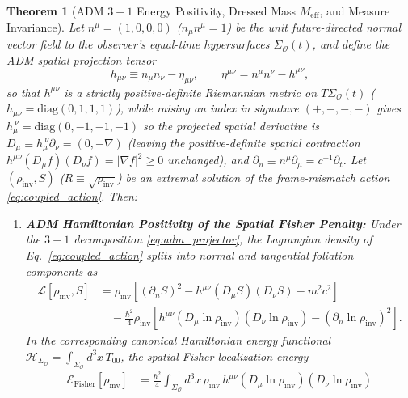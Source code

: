 \documentclass[11pt, a4paper]{article}
\newtheorem{theorem}{Theorem}[section]
\theoremstyle{definition}
\begin{document}
\begin{theorem}[ADM $3+1$ Energy Positivity, Dressed Mass $M_{\text{eff}}$, and Measure Invariance]
\label{thm:adm_positivity}
Let $n^\mu = (1, 0, 0, 0)$ ($n_\mu n^\mu = 1$) be the unit future-directed normal vector field to the observer's equal-time hypersurfaces $\Sigma_{\mathcal{O}}(t)$, and define the ADM spatial projection tensor
\begin{equation}
\label{eq:adm_projector}
h_{\mu\nu} \equiv n_\mu n_\nu - \eta_{\mu\nu}, \qquad \eta^{\mu\nu} = n^\mu n^\nu - h^{\mu\nu},
\end{equation}
so that $h^{\mu\nu}$ is a strictly positive-definite Riemannian metric on $T\Sigma_{\mathcal{O}}(t)$ ($h_{\mu\nu} = \text{diag}(0, 1, 1, 1)$), while raising an index in signature $(+,-,-,-)$ gives $h_\mu^{\ \nu} = \text{diag}(0, -1, -1, -1)$ so the projected spatial derivative is $D_\mu \equiv h_\mu^{\ \nu}\partial_\nu = (0, -\nabla)$ (leaving the positive-definite spatial contraction $h^{\mu\nu}(D_\mu f)(D_\nu f) = |\nabla f|^2 \ge 0$ unchanged), and $\partial_n \equiv n^\mu \partial_\mu = c^{-1}\partial_t$. Let $(\rho_{\text{inv}}, S)$ ($R \equiv \sqrt{\rho_{\text{inv}}}$) be an extremal solution of the frame-mismatch action \eqref{eq:coupled_action}. Then:
\begin{enumerate}[label=(\roman*)]
    \item \textbf{ADM Hamiltonian Positivity of the Spatial Fisher Penalty:} Under the $3+1$ decomposition \eqref{eq:adm_projector}, the Lagrangian density of Eq.~\eqref{eq:coupled_action} splits into normal and tangential foliation components as
    \begin{equation}
    \label{eq:adm_lagrangian}
    \begin{aligned}
    \mathcal{L}[\rho_{\text{inv}}, S] &= \rho_{\text{inv}} \left[ (\partial_n S)^2 - h^{\mu\nu}(D_\mu S)(D_\nu S) - m^2 c^2 \right] \\
    &\quad - \frac{\hbar^2}{4}\rho_{\text{inv}} \left[ h^{\mu\nu}(D_\mu \ln\rho_{\text{inv}})(D_\nu \ln\rho_{\text{inv}}) - (\partial_n \ln\rho_{\text{inv}})^2 \right].
    \end{aligned}
    \end{equation}
    In the corresponding canonical Hamiltonian energy functional $\mathcal{H}_{\Sigma_{\mathcal{O}}} = \int_{\Sigma_{\mathcal{O}}} d^3x \, T_{00}$, the spatial Fisher localization energy
    \begin{equation}
    \label{eq:spatial_fisher_pos}
    \begin{aligned}
    \mathcal{E}_{\text{Fisher}}[\rho_{\text{inv}}] &= \frac{\hbar^2}{4} \int_{\Sigma_{\mathcal{O}}} d^3x \, \rho_{\text{inv}} \, h^{\mu\nu}(D_\mu \ln\rho_{\text{inv}})(D_\nu \ln\rho_{\text{inv}}) \\

\end{aligned}
\end{equation}
\end{enumerate}
\end{theorem}
\end{document}
